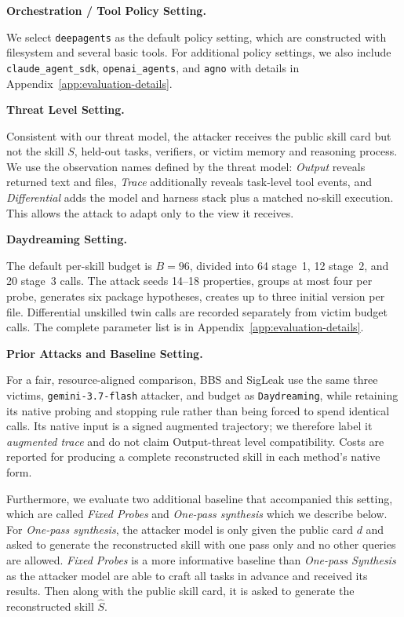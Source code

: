 \documentclass[letterpaper,twocolumn,10pt]{article}
\newcommand{\method}{\texttt{Daydreaming}\xspace}
\newcommand{\geminimodel}{\texttt{gemini-3.7-flash}}
\newcommand{\paragraphtitle}[1]{%
  \vspace{5pt}\noindent\textbf{#1.}%
}
\begin{document}
\paragraphtitle{Orchestration / Tool Policy Setting}
We select \texttt{deepagents} as the default policy setting, which are constructed with filesystem and several basic tools. For additional policy settings, we also include \texttt{claude\_agent\_sdk}, \texttt{openai\_agents}, and \texttt{agno} with details in Appendix~\ref{app:evaluation-details}. 


\paragraphtitle{Threat Level Setting}
Consistent with our threat model, the attacker receives the public skill card but not the skill $S$, held-out tasks, verifiers, or victim memory and reasoning process. We use the observation names defined by the threat model: \emph{Output} reveals returned text and files, \emph{Trace} additionally
reveals task-level tool events, and \emph{Differential} adds the model and
harness stack plus a matched no-skill execution. This allows the attack to adapt only to the view it receives. 

\paragraphtitle{Daydreaming Setting}
The default per-skill budget is $B=96$, divided into 64 stage~1, 12 stage~2, and 20 stage~3 calls. The attack seeds 14--18 properties, groups at most four per probe, generates six package hypotheses, creates up to three initial version per file. Differential unskilled twin calls are recorded separately from victim budget calls.  The complete parameter list is
in Appendix~\ref{app:evaluation-details}.

\paragraphtitle{Prior Attacks and Baseline Setting}
For a fair, resource-aligned comparison, BBS and SigLeak use the same three victims, \geminimodel{} attacker, and budget as \method, while retaining its native probing and stopping rule rather than being forced to spend identical calls. Its native input is a signed augmented trajectory; we therefore label it \emph{augmented trace} and do not claim Output-threat level compatibility. Costs are reported for producing a complete reconstructed skill in each method's native form. 

Furthermore, we evaluate two additional baseline that accompanied this setting, which are called \textit{Fixed Probes} and \textit{One-pass synthesis} which we describe below. For \textit{One-pass synthesis}, the attacker model is only given the public card $d$ and asked to generate the reconstructed skill with one pass only and no other queries are allowed. \textit{Fixed Probes} is a more informative baseline than \textit{One-pass Synthesis} as the attacker model are able to craft all tasks in advance and received its results. Then along with the public skill card, it is asked to generate the reconstructed skill $\widehat{S}$.  
\end{document}
